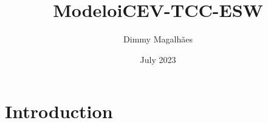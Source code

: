 \documentclass{article}
\title{ModeloiCEV-TCC-ESW}
\author{Dimmy Magalhães}
\date{July 2023}
\begin{document}
\maketitle

\section{Introduction}
\end{document}

